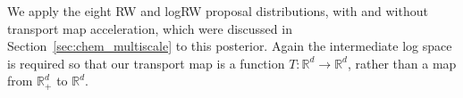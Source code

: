 \documentclass[final]{siamltex}
\begin{document}
%
%
%
We apply the eight RW and logRW proposal distributions, with and without transport map acceleration, which were discussed in Section~\ref{sec:chem_multiscale} to this posterior. Again the intermediate log space is required so that our transport map is a function $T\colon\mathbb{R}^d\rightarrow\mathbb{R}^d$, rather than a map from $\mathbb{R}_+^d$ to $\mathbb{R}^d$.
\end{document}

